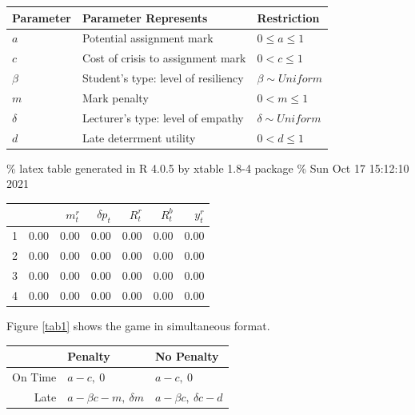 \documentclass[11pt,preprint, authoryear]{elsarticle}
\let\origtable\table
\let\endorigtable\endtable
\renewenvironment{table}[1][2] {
    \expandafter\origtable\expandafter[H]
} {
    \endorigtable
}
\numberwithin{equation}{section}
\numberwithin{figure}{section}
\numberwithin{table}{section}
\begin{document}
\begin{table}[H]
\centering
\begin{tabular}{lll}
  \toprule
Parameter & Parameter Represents & Restriction \\ 
  \midrule
$a$ & Potential assignment mark & $0\leq a \leq 1$ \\ 
  $c$ & Cost of crisis to assignment mark & $0 < c \leq 1$ \\ 
  $\beta$ & Student's type: level of resiliency & $\beta \sim Uniform$  \\ 
  $m$ & Mark penalty & $0 < m \leq 1$ \\ 
  $\delta$ & Lecturer's type: level of empathy & $\delta \sim Uniform$ \\ 
  $d$ & Late deterrment utility & $0<d \leq 1$ \\ 
   \bottomrule
\end{tabular}
\caption{Game Parameters \label{sum}} 
\end{table}

\% latex table generated in R 4.0.5 by xtable 1.8-4 package \% Sun Oct
17 15:12:10 2021

\begin{table}[ht]
\centering
\begin{tabular}{rrrrrrr}
  \hline
 &   & $m^r_t$ & $\delta p_t$ & $R^r_t$ & $R^b_t$ & $y^r_t$ \\ 
  \hline
1 & 0.00 & 0.00 & 0.00 & 0.00 & 0.00 & 0.00 \\ 
  2 & 0.00 & 0.00 & 0.00 & 0.00 & 0.00 & 0.00 \\ 
  3 & 0.00 & 0.00 & 0.00 & 0.00 & 0.00 & 0.00 \\ 
  4 & 0.00 & 0.00 & 0.00 & 0.00 & 0.00 & 0.00 \\ 
   \hline
\end{tabular}
\end{table}

Figure \ref{tab1} shows the game in simultaneous format.

\begin{table}[H]
\centering
\begin{tabular}{rll}
  \toprule
 & Penalty & No Penalty \\ 
  \midrule
On Time & $a-c, \ 0$ & $a-c, \ 0$ \\ 
  Late & $a-\beta c - m, \ \delta m$ & $a-\beta c, \ \delta c -d$ \\ 
   \bottomrule
\end{tabular}
\caption{Simultaneous Game \label{tab1}} 
\end{table}
\end{document}
